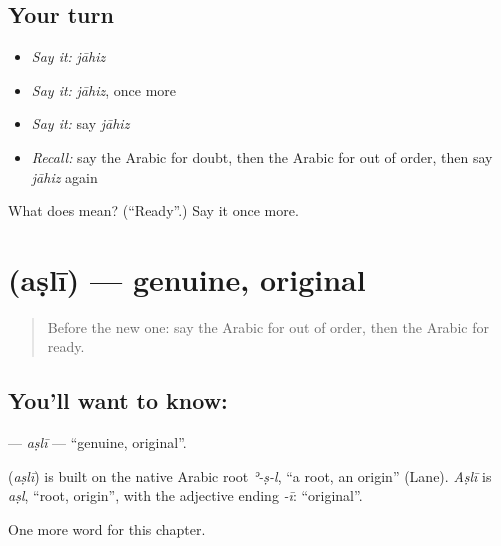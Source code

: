\subsection*{Your turn}
\begin{itemize}
\raggedright
  \item \emph{Say it:} \emph{jāhiz}
  \item \emph{Say it:} \emph{jāhiz}, once more
  \item \emph{Say it:} say \emph{jāhiz}
  \item \emph{Recall:} say the Arabic for doubt, then the Arabic for out of order, then say \emph{jāhiz} again
\end{itemize}

\begin{tcolorbox}[breakable,colback=teal!4,colframe=teal!35!black,title={Before you move on}]
What does  mean? (\textquotedblleft{}Ready\textquotedblright{}.) Say it once more.
\end{tcolorbox}
\section[\texorpdfstring{\ar{أصلي} (aṣlī)}{أصلي (aṣlī)}]{ (aṣlī) — genuine, original}

\label{lesson:AR-C240-asli}



\begin{quote}
Before the new one: say the Arabic for out of order, then the Arabic for ready.
\end{quote}

\subsection*{You'll want to know: }
\textbf{} — \emph{aṣlī} — \textquotedblleft{}genuine, original\textquotedblright{}.

\begin{cousinweb}
\textbf{} (\emph{aṣlī}) is built on the native Arabic root \emph{ʾ-ṣ-l}, \textquotedblleft{}a root, an origin\textquotedblright{} (Lane). \emph{Aṣlī} is \emph{aṣl}, \textquotedblleft{}root, origin\textquotedblright{}, with the adjective ending \emph{-ī}: \textquotedblleft{}original\textquotedblright{}.
\end{cousinweb}

\begin{grammarlens}[title={What you've built}]
One more word for this chapter.
\end{grammarlens}

